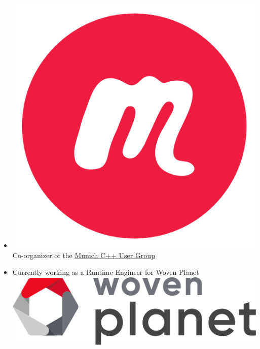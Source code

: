 \documentclass[aspectratio=169]{beamer}
\begin{document}
\begin{frame}[fragile]
\begin{itemize}
    \item \includegraphics[height=.05\textheight]{resources/meetup-icon.png} Co-organizer of the \href{https://www.meetup.com/MUCplusplus/}{Munich C++ User Group}

    \item Currently working as a Runtime Engineer for Woven Planet \includegraphics[height=.1\textheight]{resources/Woven_Planet_Holdings_Logo.png}

  \end{itemize}
\end{frame}
\end{document}
